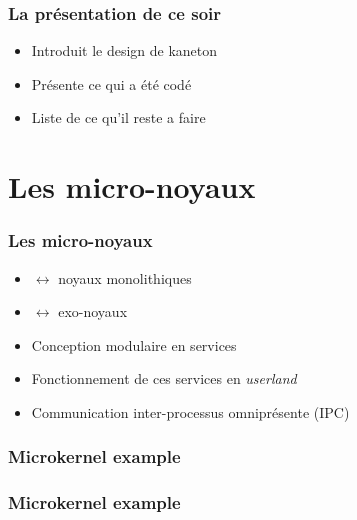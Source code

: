 
\begin{frame}
  \frametitle{La pr\'{e}sentation de ce soir}

  \begin{itemize}
  \item
    Introduit le design de kaneton
  \item
    Pr\'{e}sente ce qui a \'{e}t\'{e} cod\'{e}
  \item
    Liste de ce qu'il reste a faire
  \end{itemize}
\end{frame}

%
%

\section{Les micro-noyaux}


\begin{frame}
  \frametitle{Les micro-noyaux}

  \begin{itemize}
  \item
    $\leftrightarrow$ noyaux monolithiques
  \item
    $\leftrightarrow$ exo-noyaux
  \item
    Conception modulaire en services
  \item
    Fonctionnement de ces services en \emph{userland}
  \item
    Communication inter-processus omnipr\'{e}sente (IPC)
  \end{itemize}

\end{frame}


\begin{frame}
  \frametitle{Microkernel example}

  \begin{center}
  \end{center}
\end{frame}


\begin{frame}
  \frametitle{Microkernel example}

  \begin{center}
  \end{center}
\end{frame}

